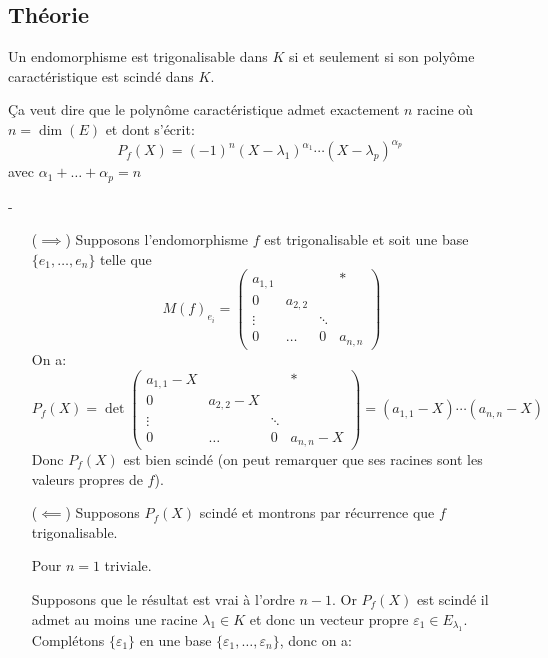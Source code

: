 \subsection{Théorie}
\begin{theorem}
    Un endomorphisme est trigonalisable dans $K$ si et seulement si son polyôme caractéristique est scindé dans  $K$. 
    \par 
    Ça veut dire que le polynôme caractéristique admet exactement $n$ racine où  $n = \dim(E)$ et dont s'écrit:
     \[
         P_f(X) = (-1)^n(X - \lambda_1)^{\alpha_1}\cdots(X - \lambda_p)^{\alpha_p}
    \] 
    avec $\alpha_1 + \ldots + \alpha_p = n$
\end{theorem}
\begin{preuve} -
   \begin{itemize}
       \item[($\implies$)] Supposons l'endomorphisme $f$ est trigonalisable et soit une base  $\{e_1, \ldots, e_n\}$ telle que
           \[
               M(f)_{e_i} = \begin{pmatrix} 
                   a_{1,1} &            & & *\\
                   0       & a_{2, 2}   & & \\
                   \vdots  &      & \ddots & \\
                   0        & \ldots    & 0 & a_{n, n}
               \end{pmatrix} 
           \] 
           On a:
           \[
            P_f(X) = \det \begin{pmatrix} 
                   a_{1,1} - X &            & & *\\
                   0       & a_{2, 2} - X   & & \\
                   \vdots  &      & \ddots & \\
                   0        & \ldots    & 0 & a_{n, n} - X
               \end{pmatrix} = (a_{1,1} - X) \cdots (a_{n,n} - X)
           \] 
           Donc $P_f(X)$ est bien scindé (on peut remarquer que ses racines sont les valeurs propres de $f$).
       \item[($\impliedby$)] Supposons $P_f(X)$ scindé et montrons par récurrence que  $f$ trigonalisable.
            \par
            Pour  $n=1$ triviale.
            \par
            Supposons que le résultat est vrai à l'ordre  $n-1$. Or  $P_f(X)$ est scindé il admet au moins une racine  $\lambda_1 \in K$ et donc un vecteur propre $\varepsilon_1 \in E_{\lambda_1}$. Complétons $\{\varepsilon_1\}$ en une base $\{\varepsilon_1, \ldots, \varepsilon_n\}$, donc on a:

\end{itemize}
\end{preuve}
